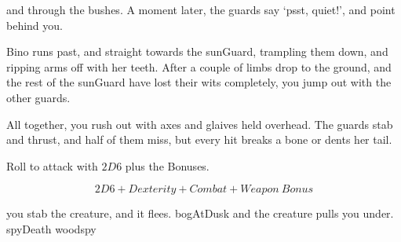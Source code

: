 and through the bushes.
A moment later, the \glspl{guard} say `psst, quiet!', and point behind you.

Bino runs past, and straight towards the \gls{sunGuard}, trampling them down, and ripping arms off with her teeth.
After a couple of limbs drop to the ground, and the rest of the \gls{sunGuard} have lost their wits completely, you jump out with the other \glspl{guard}.

All together, you rush out with axes and glaives held overhead.
The \glspl{guard} stab and thrust, and half of them miss, but every hit breaks a bone or dents her tail.

Roll to attack with $2D6$ plus the Bonuses.

$$2D6 + Dexterity + Combat + Weapon~Bonus$$

\begin{selectPath}
  {you stab the creature, and it flees.}%
  {bogAtDusk}
  {and the creature pulls you under.}%
  {spyDeath} \gls{woodspy}
\end{selectPath}
